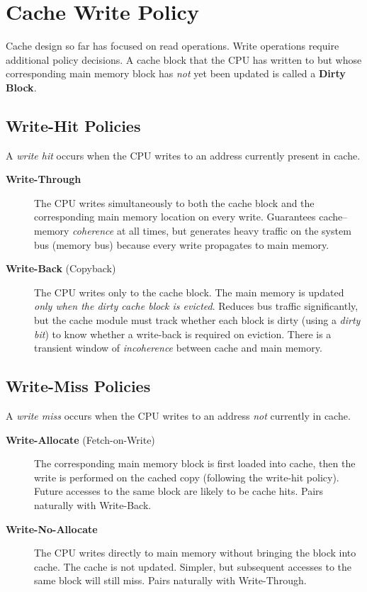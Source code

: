 \documentclass[11pt, a4paper, notitlepage]{report}
\theoremstyle{definition}
\theoremstyle{remark}
\theoremstyle{definition}
\begin{document}
\section{Cache Write Policy}
\label{sec:cache-write}

Cache design so far has focused on read operations. Write operations require additional policy decisions. A cache block that the CPU has written to but whose corresponding main memory block has \emph{not} yet been updated is called a \textbf{Dirty Block}.

\subsection{Write-Hit Policies}
\label{sec:write-hit}

A \emph{write hit} occurs when the CPU writes to an address currently present in cache.

\begin{description}
  \item[\textbf{Write-Through}] The CPU writes simultaneously to both the cache block and the corresponding main memory location on every write. Guarantees cache–memory \emph{coherence} at all times, but generates heavy traffic on the system bus (memory bus) because every write propagates to main memory.

  \item[\textbf{Write-Back} (Copyback)] The CPU writes only to the cache block. The main memory is updated \emph{only when the dirty cache block is evicted}. Reduces bus traffic significantly, but the cache module must track whether each block is dirty (using a \emph{dirty bit}) to know whether a write-back is required on eviction. There is a transient window of \emph{incoherence} between cache and main memory.
\end{description}

\subsection{Write-Miss Policies}
\label{sec:write-miss}

A \emph{write miss} occurs when the CPU writes to an address \emph{not} currently in cache.

\begin{description}
  \item[\textbf{Write-Allocate} (Fetch-on-Write)] The corresponding main memory block is first loaded into cache, then the write is performed on the cached copy (following the write-hit policy). Future accesses to the same block are likely to be cache hits. Pairs naturally with Write-Back.
  \item[\textbf{Write-No-Allocate}] The CPU writes directly to main memory without bringing the block into cache. The cache is not updated. Simpler, but subsequent accesses to the same block will still miss. Pairs naturally with Write-Through.
\end{description}
\end{document}
